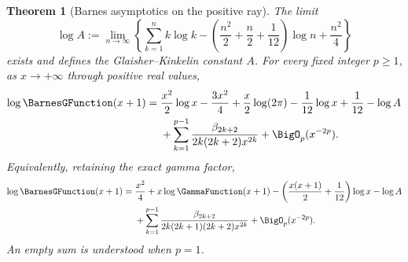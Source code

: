 \documentclass[11pt,a4paper,oneside,openany]{book}
\newtheorem{theorem}{Theorem}[chapter]
\theoremstyle{definition}
\theoremstyle{remark}
\begin{document}
\begin{theorem}[Barnes asymptotics on the positive ray]
\label{thm:merged-barnes-asymptotic}
The limit
\begin{equation}
 \log A:=\lim_{n\to\infty}\left\{
 \sum_{k=1}^{n}k\log k-
 \left(\frac{n^2}{2}+\frac n2+\frac1{12}\right)\log n
 +\frac{n^2}{4}\right\}                                         \label{eq:merged-glaisher}
\end{equation}
exists and defines the Glaisher--Kinkelin constant $A$.  For every fixed
integer $p\geq1$, as $x\to+\infty$ through positive real values,
\begin{align}
 \log \BarnesGFunction(x+1)
 ={}&\frac{x^2}{2}\log x-\frac{3x^2}{4}
 +\frac{x}{2}\log(2\pi)-\frac1{12}\log x
 +\frac1{12}-\log A                                                \notag\\
 &+\sum_{k=1}^{p-1}\frac{\beta_{2k+2}}
 {2k(2k+2)x^{2k}}+\BigO_p(x^{-2p}).                                   \label{eq:merged-barnes-standard-asymptotic}
\end{align}
Equivalently, retaining the exact gamma factor,
\begin{align}
 \log \BarnesGFunction(x+1)
 ={}&\frac{x^2}{4}+x\log\GammaFunction(x+1)
 -\left(\frac{x(x+1)}2+\frac1{12}\right)\log x-\log A            \notag\\
 &+\sum_{k=1}^{p-1}\frac{\beta_{2k+2}}
 {2k(2k+1)(2k+2)x^{2k}}+\BigO_p(x^{-2p}).                             \label{eq:merged-barnes-asymptotic}
\end{align}
An empty sum is understood when $p=1$.
\end{theorem}
\end{document}
